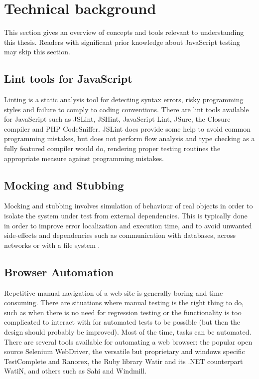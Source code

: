 \documentclass[11pt]{article}
\begin{document}
\section{Technical background}

This section gives an overview of concepts and tools relevant to understanding this thesis. Readers with significant prior knowledge about JavaScript testing may skip this section.

\subsection{Lint tools for JavaScript}
\label{sec:Lint}

Linting is a static analysis tool for detecting syntax errors, risky programming styles and failure to comply to coding conventions. There are lint tools available for JavaScript such as JSLint, JSHint, JavaScript Lint, JSure, the Closure compiler and PHP CodeSniffer. JSLint does provide some help to avoid common programming mistakes, but does not perform flow analysis\cite{JSLint} and type checking as a fully featured compiler would do, rendering proper testing routines the appropriate measure against programming mistakes.

\subsection{Mocking and Stubbing}
\label{sec:mocking}

Mocking and stubbing involves simulation of behaviour of real objects in order to isolate the system under test from external dependencies. This is typically done in order to improve error localization and execution time, and to avoid unwanted side-effects and dependencies such as communication with databases, across networks or with a file system \cite[ch.~2]{Legacy}.

\subsection{Browser Automation}
\label{sec:browserautomation}

Repetitive manual navigation of a web site is generally boring and time consuming. There are situations where manual testing is the right thing to do, such as when there is no need for regression testing or the functionality is too complicated to interact with for automated tests to be possible (but then the design should probably be improved). Most of the time, tasks can be automated. There are several tools available for automating a web browser: the popular open source Selenium WebDriver, the versatile but proprietary and windows specific TestComplete and Ranorex, the Ruby library Watir and its .NET counterpart WatiN, and others such as Sahi and Windmill.
\end{document}
